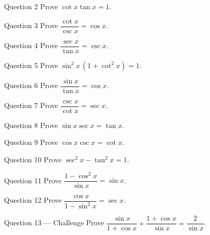 \documentclass[11pt]{article}
\begin{document}
\begin{qbox}{Question 2}
Prove $\cot x\tan x=1$.\workspace{2.4cm}
\end{qbox}

\begin{qbox}{Question 3}
Prove $\dfrac{\cot x}{\csc x}=\cos x$.\workspace{2.4cm}
\end{qbox}

\begin{qbox}{Question 4}
Prove $\dfrac{\sec x}{\tan x}=\csc x$.\workspace{2.4cm}
\end{qbox}

\begin{qbox}{Question 5}
Prove $\sin^2 x\,(1+\cot^2 x)=1$.\workspace{2.4cm}
\end{qbox}

\begin{qbox}{Question 6}
Prove $\dfrac{\sin x}{\tan x}=\cos x$.\workspace{2.4cm}
\end{qbox}

\begin{qbox}{Question 7}
Prove $\dfrac{\csc x}{\cot x}=\sec x$.\workspace{2.4cm}
\end{qbox}

\begin{qbox}{Question 8}
Prove $\sin x\sec x=\tan x$.\workspace{2.4cm}
\end{qbox}

\begin{qbox}{Question 9}
Prove $\cos x\csc x=\cot x$.\workspace{2.4cm}
\end{qbox}

\begin{qbox}{Question 10}
Prove $\sec^2 x-\tan^2 x=1$.\workspace{2.4cm}
\end{qbox}

\begin{qbox}{Question 11}
Prove $\dfrac{1-\cos^2 x}{\sin x}=\sin x$.\workspace{2.4cm}
\end{qbox}

\begin{qbox}{Question 12}
Prove $\dfrac{\cos x}{1-\sin^2 x}=\sec x$.\workspace{2.4cm}
\end{qbox}

\begin{qbox}{Question 13 --- Challenge}
Prove $\dfrac{\sin x}{1+\cos x}+\dfrac{1+\cos x}{\sin x}=\dfrac{2}{\sin x}$.\workspace{4cm}
\end{qbox}

\clearpage
{}
\end{document}

